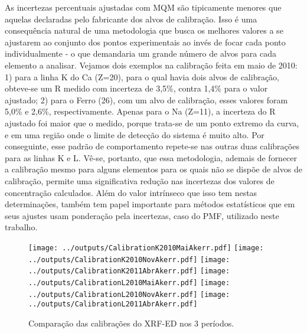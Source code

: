 As incertezas percentuais ajustadas com MQM são tipicamente menores que aquelas 
declaradas pelo fabricante dos alvos de calibração. Isso é uma consequência 
natural de uma metodologia que busca os melhores valores a se ajustarem ao 
conjunto dos pontos experimentais ao invés de focar cada ponto individualmente -
o que demandaria um grande número de alvos para cada elemento a analisar. 
Vejamos dois exemplos na calibração feita em maio de 2010: 
1) para a linha K do Ca (Z=20), para o qual havia dois alvos de calibração, 
obteve-se um R medido com incerteza de 3,5\%, contra 1,4\% para o valor ajustado; 
2) para o Ferro (26), com um alvo de calibração, esses valores foram 5,0\% e 
2,6\%, respectivamente. Apenas para o Na (Z=11), a incerteza do R ajustado foi 
maior que o medido, porque trata-se de um ponto extremo da curva, e em uma 
região onde o limite de detecção do sistema é muito alto. Por conseguinte, esse 
padrão de comportamento repete-se nas outras duas calibrações para as linhas K 
e L.
Vê-se, portanto, que essa metodologia, ademais de fornecer a calibração mesmo 
para alguns elementos para os quais não se dispõe de alvos de calibração, 
permite uma significativa redução nas incertezas dos valores de concentração 
calculados. Além do valor intrínseco que isso tem nestas determinações, 
também tem papel importante para métodos estatísticos que em seus ajustes 
usam ponderação pela incertezas, caso do PMF, utilizado neste trabalho.

\begin{landscape}
\begin{figure}
    \centering
    \texttt{[image: ../outputs/CalibrationK2010MaiAkerr.pdf]}
    \texttt{[image: ../outputs/CalibrationK2010NovAkerr.pdf]}
    \texttt{[image: ../outputs/CalibrationK2011AbrAkerr.pdf]}
    \texttt{[image: ../outputs/CalibrationL2010MaiAkerr.pdf]}
    \texttt{[image: ../outputs/CalibrationL2010NovAkerr.pdf]}
    \texttt{[image: ../outputs/CalibrationL2011AbrAkerr.pdf]}
    \caption{Comparação das calibrações do XRF-ED nos 3 períodos. 
            \label{fig:edx_calib3}}
\end{figure}
\end{landscape}

\begin{landscape}
  
\end{landscape}

\begin{landscape}
  
\end{landscape}

